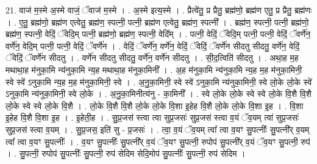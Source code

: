 \documentclass[17pt]{extarticle}
\begin{document}
21. वाज॑ म॒स्मे अ॒स्मे वाजं॒ ॅवाज॑ म॒स्मे । . अ॒स्मे इत्य॒स्मे । . प्रैत्वे॑तु॒ प्र प्रैतु॒ ब्रह्म॑णो॒ ब्रह्म॑ण एतु॒ प्र प्रैतु॒ ब्रह्म॑णः । . ए॒तु॒ ब्रह्म॑णो॒ ब्रह्म॑ण एत्वेतु॒ ब्रह्म॑ण॒ स्पत्नी॒ पत्नी॒ ब्रह्म॑ण एत्वेतु॒ ब्रह्म॑ण॒ स्पत्नी᳚ । . ब्रह्म॑ण॒ स्पत्नी॒ पत्नी॒ ब्रह्म॑णो॒ ब्रह्म॑ण॒ स्पत्नी॒ वेदिं॒ ॅवेदि॒म् पत्नी॒ ब्रह्म॑णो॒ ब्रह्म॑ण॒ स्पत्नी॒ वेदि᳚म् । . पत्नी॒ वेदिं॒ ॅवेदि॒म् पत्नी॒ पत्नी॒ वेदिं॒ ॅवर्णे॑न॒ वर्णे॑न॒ वेदि॒म् पत्नी॒ पत्नी॒ वेदिं॒ ॅवर्णे॑न । . वेदिं॒ ॅवर्णे॑न॒ वर्णे॑न॒ वेदिं॒ ॅवेदिं॒ ॅवर्णे॑न सीदतु सीदतु॒ वर्णे॑न॒ वेदिं॒ ॅवेदिं॒ ॅवर्णे॑न सीदतु । . वर्णे॑न सीदतु सीदतु॒ वर्णे॑न॒ वर्णे॑न सीदतु । . सी॒द॒त्विति॑ सीदतु । . अथा॒ह म॒ह मथाथा॒ह म॑नुका॒मि न्य॑नुका॒मि न्य॒ह मथाथा॒ह म॑नुका॒मिनी᳚ । . अ॒ह म॑नुका॒मि न्य॑नुका॒मि न्य॒ह म॒ह म॑नुका॒मिनी॒ स्वे स्वे॑ ऽनुका॒मि न्य॒ह म॒ह म॑नुका॒मिनी॒ स्वे । . अ॒नु॒का॒मिनी॒ स्वे स्वे॑ ऽनुका॒मि न्य॑नुका॒मिनी॒ स्वे लो॒के लो॒के स्वे॑ ऽनुका॒मि न्य॑नुका॒मिनी॒ स्वे लो॒के । . अ॒नु॒का॒मिनीत्य॑नु - का॒मिनी᳚ । . स्वे लो॒के लो॒के स्वे स्वे लो॒के वि॒शै वि॒शै लो॒के स्वे स्वे लो॒के वि॒शै । . लो॒के वि॒शै वि॒शै लो॒के लो॒के वि॒शा इ॒हेह वि॒शै लो॒के लो॒के वि॒शा इ॒ह । . वि॒शा इ॒हेह वि॒शै वि॒शा इ॒ह । . इ॒हेती॒ह । . सु॒प्र॒जस॑ स्त्वा त्वा सुप्र॒जसः॑ सुप्र॒जस॑ स्त्वा व॒यं ॅव॒यम् त्वा॑ सुप्र॒जसः॑ सुप्र॒जस॑ स्त्वा व॒यम् । . सु॒प्र॒जस॒ इति॑ सु - प्र॒जसः॑ । . त्वा॒ व॒यं ॅव॒यम् त्वा᳚ त्वा व॒यꣳ सु॒पत्नीः᳚ सु॒पत्नी᳚र् व॒यम् त्वा᳚ त्वा व॒यꣳ सु॒पत्नीः᳚ । . व॒यꣳ सु॒पत्नीः᳚ सु॒पत्नी᳚र् व॒यं ॅव॒यꣳ सु॒पत्नी॒ रुपोप॑ सु॒पत्नी᳚र् व॒यं ॅव॒यꣳ सु॒पत्नी॒ रुप॑ । . सु॒पत्नी॒ रुपोप॑ सु॒पत्नीः᳚ सु॒पत्नी॒ रुप॑ सेदिम सेदि॒मोप॑ सु॒पत्नीः᳚ सु॒पत्नी॒ रुप॑ सेदिम । \newline
\end{document}
